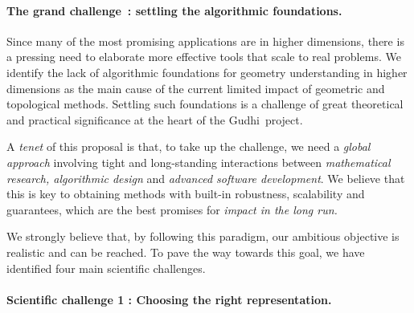\paragraph{The grand challenge~: settling the algorithmic foundations.}
Since many of the most promising applications are in higher dimensions, there is a pressing need to elaborate more effective tools that scale to real problems.  We identify the lack of  algorithmic foundations for geometry understanding in higher dimensions as 
the main cause of the current limited impact of geometric and topological methods.  Settling such foundations
is a challenge of great theoretical and practical significance at the heart of the Gudhi~project.


A {\em tenet} of this proposal is that, to take up the challenge, we need a {\em global approach} involving tight and long-standing interactions between {\em mathematical research, algorithmic design} and {\em advanced software development}. We believe that this is key to obtaining methods with built-in robustness, scalability and guarantees, which are the best promises for {\em impact in the long run.}

We strongly believe that, by following this paradigm,  our ambitious objective is realistic and can be reached. To pave the way towards this goal, we have identified  four main scientific challenges.



\paragraph{Scientific challenge 1 :  Choosing the right representation.}


